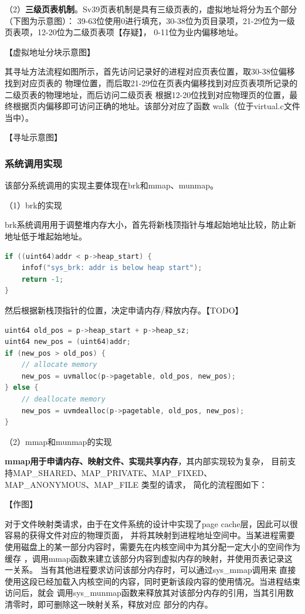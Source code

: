\documentclass[UTF8,a4paper,10pt]{ctexart}
\begin{document}
（2）\textbf{三级页表机制}。Sv39页表机制是具有三级页表的，虚拟地址将分为五个部分（下图为示意图）：
39-63位使用0进行填充，30-38位为页目录项，21-29位为一级页表项，12-20位为二级页表项【存疑】，
0-11位为业内偏移地址。

【虚拟地址分块示意图】

其寻址方法流程如图所示，首先访问记录好的进程对应页表位置，取30-38位偏移找到对应页表的
物理位置，而后取21-29位在页表内偏移找到对应页表项所记录的二级页表的物理地址，而后访问二级页表
根据12-20位找到对应物理页的位置，最终根据页内偏移即可访问正确的地址。该部分对应了函数
walk（位于virtual.c文件当中）。

【寻址示意图】

\subsubsection{系统调用实现}

该部分系统调用的实现主要体现在brk和mmap、munmap。

（1）brk的实现

brk系统调用用于调整堆内存大小，首先将新栈顶指针与堆起始地址比较，防止新地址低于堆起始地址。

\begin{lstlisting}[title=检查brk参数,frame=trbl,language={C}]
if ((uint64)addr < p->heap_start) {
    infof("sys_brk: addr is below heap start");
    return -1;
}
\end{lstlisting}

然后根据新栈顶指针的位置，决定申请内存/释放内存。【TODO】

\begin{lstlisting}[title=brk实现,frame=trbl,language={C}]
uint64 old_pos = p->heap_start + p->heap_sz;
uint64 new_pos = (uint64)addr;
if (new_pos > old_pos) {
    // allocate memory
    new_pos = uvmalloc(p->pagetable, old_pos, new_pos);
} else {
    // deallocate memory
    new_pos = uvmdealloc(p->pagetable, old_pos, new_pos);
}
\end{lstlisting}

（2）mmap和munmap的实现



\textbf{mmap用于申请内存、映射文件、实现共享内存}，其内部实现较为复杂，
目前支持MAP\_SHARED、MAP\_PRIVATE、MAP\_FIXED、MAP\_ANONYMOUS、MAP\_FILE 类型的请求，
简化的流程图如下：

【作图】

对于文件映射类请求，由于在文件系统的设计中实现了page cache层，因此可以很容易的获得文件对应的物理页面，
并将其映射到进程地址空间中。当某进程需要使用磁盘上的某一部分内容时，需要先在内核空间中为其分配一定大小的空间作为缓存
，调用mmap函数来建立该部分内容到虚拟内存的映射，并使用页表记录这一关系。
当有其他进程要求访问该部分内存时，可以通过sys\_mmap调用来
直接使用这段已经加载入内核空间的内容，同时更新该段内容的使用情况。当进程结束访问后，就会
调用sys\_munmap函数来释放其对该部分内存的引用，当其引用数清零时，即可删除这一映射关系，释放对应
部分的内存。
\end{document}
